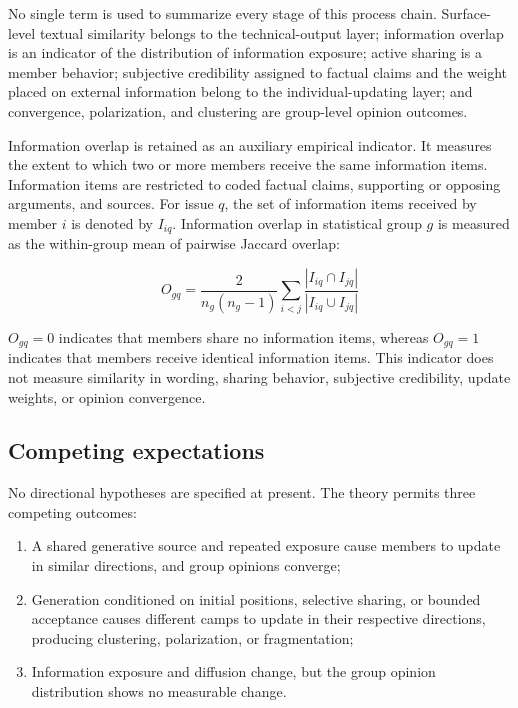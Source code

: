\documentclass[11pt,a4paper]{article}
\begin{document}
No single term is used to summarize every stage of this process chain. Surface-level textual similarity belongs to the technical-output layer; information overlap is an indicator of the distribution of information exposure; active sharing is a member behavior; subjective credibility assigned to factual claims and the weight placed on external information belong to the individual-updating layer; and convergence, polarization, and clustering are group-level opinion outcomes.

Information overlap is retained as an auxiliary empirical indicator. It measures the extent to which two or more members receive the same information items. Information items are restricted to coded factual claims, supporting or opposing arguments, and sources. For issue $q$, the set of information items received by member $i$ is denoted by $I_{iq}$. Information overlap in statistical group $g$ is measured as the within-group mean of pairwise Jaccard overlap:

\begin{equation*}
O_{gq}
=
\frac{2}{n_g(n_g-1)}
\sum_{i<j}
\frac{|I_{iq}\cap I_{jq}|}{|I_{iq}\cup I_{jq}|}
\end{equation*}

$O_{gq}=0$ indicates that members share no information items, whereas $O_{gq}=1$ indicates that members receive identical information items. This indicator does not measure similarity in wording, sharing behavior, subjective credibility, update weights, or opinion convergence.

\subsection{Competing expectations}

No directional hypotheses are specified at present. The theory permits three competing outcomes:

\begin{enumerate}
\item A shared generative source and repeated exposure cause members to update in similar directions, and group opinions converge;
\item Generation conditioned on initial positions, selective sharing, or bounded acceptance causes different camps to update in their respective directions, producing clustering, polarization, or fragmentation;
\item Information exposure and diffusion change, but the group opinion distribution shows no measurable change.
\end{enumerate}
\end{document}
